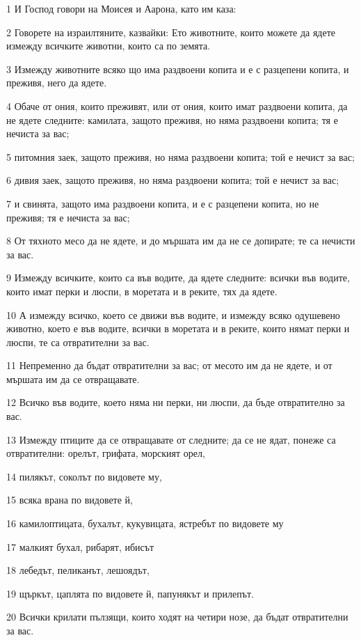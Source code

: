 \par 1 И Господ говори на Моисея и Аарона, като им каза:
\par 2 Говорете на израилтяните, казвайки: Ето животните, които можете да ядете измежду всичките животни, които са по земята.
\par 3 Измежду животните всяко що има раздвоени копита и е с разцепени копита, и преживя, него да ядете.
\par 4 Обаче от ония, които преживят, или от ония, които имат раздвоени копита, да не ядете следните: камилата, защото преживя, но няма раздвоени копита; тя е нечиста за вас;
\par 5 питомния заек, защото преживя, но няма раздвоени копита; той е нечист за вас;
\par 6 дивия заек, защото преживя, но няма раздвоени копита; той е нечист за вас;
\par 7 и свинята, защото има раздвоени копита, и е с разцепени копита, но не преживя; тя е нечиста за вас;
\par 8 От тяхното месо да не ядете, и до мършата им да не се допирате; те са нечисти за вас.
\par 9 Измежду всичките, които са във водите, да ядете следните: всички във водите, които имат перки и люспи, в моретата и в реките, тях да ядете.
\par 10 А измежду всичко, което се движи във водите, и измежду всяко одушевено животно, което е във водите, всички в моретата и в реките, които нямат перки и люспи, те са отвратителни за вас.
\par 11 Непременно да бъдат отвратителни за вас; от месото им да не ядете, и от мършата им да се отвращавате.
\par 12 Всичко във водите, което няма ни перки, ни люспи, да бъде отвратително за вас.
\par 13 Измежду птиците да се отвращавате от следните; да се не ядат, понеже са отвратителни: орелът, грифата, морският орел,
\par 14 пилякът, соколът по видовете му,
\par 15 всяка врана по видовете й,
\par 16 камилоптицата, бухалът, кукувицата, ястребът по видовете му
\par 17 малкият бухал, рибарят, ибисът
\par 18 лебедът, пеликанът, лешоядът,
\par 19 щъркът, цаплята по видовете й, папунякът и прилепът.
\par 20 Всички крилати пълзящи, които ходят на четири нозе, да бъдат отвратителни за вас.
